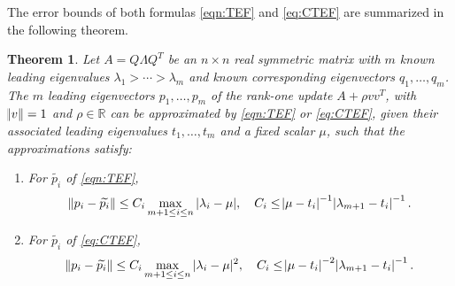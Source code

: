 \documentclass[11pt]{article}
\newtheorem{theorem}{Theorem}[section]
\begin{document}
The error bounds of both formulas \eqref{eqn:TEF} and \eqref{eq:CTEF} are summarized in the following theorem.
\begin{theorem} \label{thm:err_bnd_trunc_vecs}
Let $A = Q \Lambda Q^T $ be an ${n \times n}$ real symmetric matrix with $m$ known leading eigenvalues $\lambda_1 > \cdots > \lambda_m$ and known corresponding eigenvectors $q_1, \ldots, q_m$. The $m$ leading eigenvectors $p_1,\ldots,p_m$ of the rank-one update $A+\rho vv^T$, with $\norm{v} = 1$ and $\rho \in \mathbb{R}$ can be approximated by \eqref{eqn:TEF} or \eqref{eq:CTEF}, given their associated leading eigenvalues $t_1,\ldots,t_m$ and a fixed scalar $\mu$, such that the approximations satisfy:
\begin{enumerate}
\item For $\widetilde{p_i}$ of \eqref{eqn:TEF}, 
\begin{equation} \label{eqn:EVfirstbound}
 \norm{p_i - \widetilde{p_i}} \le C_i \max_{m+1 \leq i \leq n} | \lambda_{i} - \mu| , \quad C_i \le \abs{\mu -t_i}^{-1}\abs{\lambda_{m+1}-t_i}^{-1} . 
\end{equation}
\item For $\widetilde{p_i}$ of \eqref{eq:CTEF}, 
\begin{equation} \label{eqn:EVsecondbound}
 \norm{p_i - \widetilde{p_i}} \le C_i \max_{m+1 \leq i \leq n}|\lambda_{i} - \mu|^2 , \quad C_i \le \abs{\mu -t_i}^{-2}\abs{\lambda_{m+1}-t_i}^{-1} . 
 \end{equation}
\end{enumerate}
\end{theorem}
\end{document}
